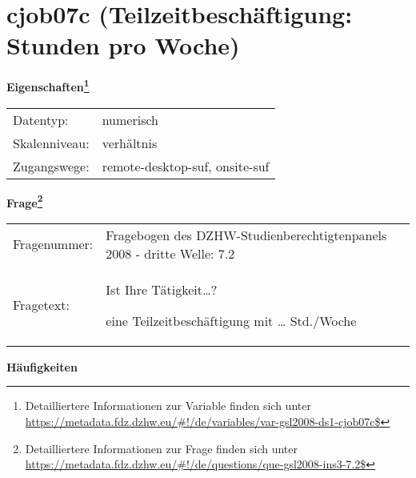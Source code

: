
    \setcounter{footnote}{0}

    \vspace*{-1.8cm}
	\section{cjob07c (Teilzeitbeschäftigung: Stunden pro Woche)}
	\label{section:cjob07c}



    \vspace*{0.5cm}
    \noindent\textbf{Eigenschaften\footnote{Detailliertere Informationen zur Variable finden sich unter
		\url{https://metadata.fdz.dzhw.eu/\#!/de/variables/var-gsl2008-ds1-cjob07c$}}}\\
	\begin{tabularx}{\hsize}{@{}lX}
	Datentyp: & numerisch \\
	Skalenniveau: & verhältnis \\
	Zugangswege: &
	  remote-desktop-suf, 
	  onsite-suf
 \\
    \end{tabularx}



				\vspace*{0.5cm}
                \noindent\textbf{Frage\footnote{Detailliertere Informationen zur Frage finden sich unter
		              \url{https://metadata.fdz.dzhw.eu/\#!/de/questions/que-gsl2008-ins3-7.2$}}}\\
				\begin{tabularx}{\hsize}{@{}lX}
					Fragenummer: &
					  Fragebogen des DZHW-Studienberechtigtenpanels 2008 - dritte Welle:
					  7.2
 \\
					Fragetext: & Ist Ihre Tätigkeit…?\par  eine Teilzeitbeschäftigung mit … Std./Woche \\
				\end{tabularx}





        		\vspace*{0.5cm}
                \noindent\textbf{Häufigkeiten}

